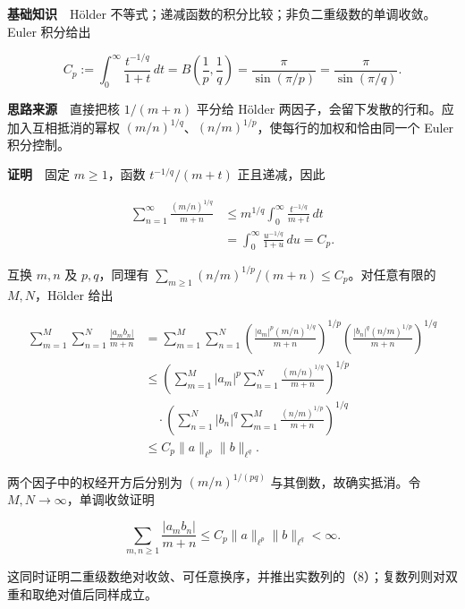 \documentclass[11pt,a4paper]{article}
\begin{document}
\textbf{基础知识}　Hölder
不等式；递减函数的积分比较；非负二重级数的单调收敛。Euler 积分给出

\begin{equation}
C_p:=\int_0^\infty\frac{t^{-1/q}}{1+t}\,dt
=B\left(\frac1p,\frac1q\right)
=\frac{\pi}{\sin(\pi/p)}
=\frac{\pi}{\sin(\pi/q)}.
\tag{9}
\end{equation}

\textbf{思路来源}　直接把核 \(1/(m+n)\) 平分给 Hölder
两因子，会留下发散的行和。应加入互相抵消的幂权
\((m/n)^{1/q}\)、\((n/m)^{1/p}\)，使每行的加权和恰由同一个 Euler
积分控制。

\textbf{证明}　固定 \(m\ge1\)，函数 \(t^{-1/q}/(m+t)\) 正且递减，因此

\begin{equation}
\begin{aligned}
\sum_{n=1}^\infty\frac{(m/n)^{1/q}}{m+n}
&\le m^{1/q}\int_0^\infty\frac{t^{-1/q}}{m+t}\,dt\\
&=\int_0^\infty\frac{u^{-1/q}}{1+u}\,du=C_p.
\end{aligned}
\tag{10}
\end{equation}

互换 \(m,n\) 及 \(p,q\)，同理有
\(\sum_{m\ge1}(n/m)^{1/p}/(m+n)\le C_p\)。对任意有限的 \(M,N\)，Hölder
给出

\begin{equation}
\begin{aligned}
\sum_{m=1}^M\sum_{n=1}^N\frac{|a_m b_n|}{m+n}
&=\sum_{m=1}^M\sum_{n=1}^N
\left(\frac{|a_m|^p(m/n)^{1/q}}{m+n}\right)^{1/p}
\left(\frac{|b_n|^q(n/m)^{1/p}}{m+n}\right)^{1/q}\\
&\le
\left(\sum_{m=1}^M|a_m|^p
\sum_{n=1}^N\frac{(m/n)^{1/q}}{m+n}\right)^{1/p}\\
&\quad\cdot
\left(\sum_{n=1}^N|b_n|^q
\sum_{m=1}^M\frac{(n/m)^{1/p}}{m+n}\right)^{1/q}\\
&\le C_p\|a\|_{\ell^p}\|b\|_{\ell^q}.
\end{aligned}
\tag{11}
\end{equation}

两个因子中的权经开方后分别为 \((m/n)^{1/(pq)}\) 与其倒数，故确实抵消。令
\(M,N\to\infty\)，单调收敛证明

\begin{equation}
\sum_{m,n\ge1}\frac{|a_m b_n|}{m+n}
\le C_p\|a\|_{\ell^p}\|b\|_{\ell^q}<\infty.
\tag{12}
\end{equation}

这同时证明二重级数绝对收敛、可任意换序，并推出实数列的（8）；复数列则对双重和取绝对值后同样成立。
\end{document}
